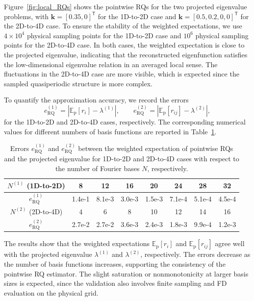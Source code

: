 \documentclass[11pt]{article}
\numberwithin{equation}{section}
\begin{document}
Figure~\ref{fig:local_RQs} shows the pointwise RQs for the two projected eigenvalue problems, with $\mathbf{k}=[0.35,0]^{\mathsf T}$ for the 1D-to-2D case and $\mathbf{k}=[0.5,0.2,0,0]^{\mathsf T}$ for the 2D-to-4D case. To ensure the stability of the weighted expectations, we use $4\times 10^4$ physical sampling points for the 1D-to-2D case and $10^6$ physical sampling points for the 2D-to-4D case. In both cases, the weighted expectation is close to the projected eigenvalue, indicating that the reconstructed eigenfunction satisfies the low-dimensional eigenvalue relation in an averaged local sense. The fluctuations in the 2D-to-4D case are more visible, which is expected since the sampled quasiperiodic structure is more complex.

To quantify the approximation accuracy, we record the errors
\begin{equation}
e_{\mathrm{RQ}}^{(1)}
=
\left|
\mathbb{E}_{\mathrm p}[r_i]-\lambda^{(1)}
\right|,
\qquad
e_{\mathrm{RQ}}^{(2)}
=
\left|
\mathbb{E}_{\mathrm p}[r_{ij}]-\lambda^{(2)}
\right|,
\label{eq:RQ_validation_errors}
\end{equation}
for the 1D-to-2D and 2D-to-4D cases, respectively. The corresponding numerical
values for different numbers of basis functions are reported in
Table~\ref{tab:RQ_validation}.

\begin{table}[htbp]
\centering
\renewcommand{\arraystretch}{1.5}
\caption{Errors $e_{\mathrm{RQ}}^{(1)}$ and $e_{\mathrm{RQ}}^{(2)}$ between the weighted expectation of pointwise RQs and the
projected eigenvalue for 1D-to-2D and 2D-to-4D cases with respect to the number of Fourier bases $N$, respectively.}
\begin{tabular}{|c|c|c|c|c|c|c|c|}
\hline
$N^{(1)}$ (1D-to-2D) & 8 & 12 & 16 & 20 & 24 & 28 & 32 \\ \hline
$e_{\mathrm{RQ}}^{(1)}$ & 1.4e-1 & 8.1e-3 & 3.0e-3 & 1.5e-3 & 7.1e-4 & 5.1e-4 & 4.5e-4 \\ \hline
$N^{(2)}$ (2D-to-4D) & 4 & 6 & 8 & 10 & 12 & 14 & 16 \\ \hline
$e_{\mathrm{RQ}}^{(2)}$ & 2.7e-2 & 2.7e-2 & 3.6e-3 & 2.4e-3 & 1.8e-3 & 9.9e-4 & 1.2e-3 \\ \hline
\end{tabular}
\label{tab:RQ_validation}
\end{table}

The results show that the weighted expectations $\mathbb{E}_{\mathrm p}[r_i]$ and $\mathbb{E}_{\mathrm p}[r_{ij}]$ agree well with the projected eigenvalue $\lambda^{(1)}$ and $\lambda^{(2)}$, respectively. The errors decrease as the number of basis functions increases, supporting the consistency of the pointwise RQ estimator. The slight saturation or nonmonotonicity at larger basis sizes is expected, since the validation also involves finite sampling and FD evaluation on the physical grid.
\end{document}
